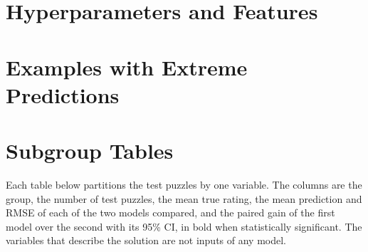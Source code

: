 \documentclass[11pt]{article}
\begin{document}



\clearpage
\appendix

\section{Hyperparameters and Features}

\begin{table}[htbp]\centering\footnotesize
{}
\caption{Hyperparameters of the networks of the fixed sequence, from their
configuration files. \emph{LR} is the peak learning rate. Values shared by
all of them are given below the table.}
\label{tab:settings}
\end{table}

\begin{table}[htbp]\centering\footnotesize
{}
\caption{Hand-crafted features: the inputs of  in addition
to the scalar context features, and of a network whose configuration includes
them. All of them are computed from the position and the opponent's
preceding move.}
\label{tab:hand}
\end{table}

\iflook
\section{Examples with Extreme Predictions}



\section{Subgroup Tables}

Each table below partitions the test puzzles by one variable. The columns are
the group, the number of test puzzles, the mean true rating, the mean
prediction and RMSE of each of the two models compared, and the paired gain
of the first model over the second with its 95\% CI, in bold when
statistically significant. The variables that describe the solution are not
inputs of any model.

\fi
\end{document}
